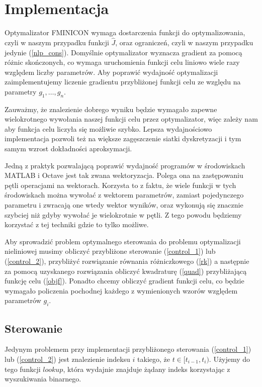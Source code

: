 \documentclass[11pt]{article}
\begin{document}
\section{Implementacja}
Optymalizator FMINICON wymaga dostarczenia funkcji do optymalizowania, czyli w naszym przypadku funkcji $\hat{J}$, oraz ograniczeń, czyli w naszym przypadku jedynie (\ref{nlp_cons}). Domyślnie optymalizator wyznacza gradient za pomocą różnic skończonych, co wymaga uruchomienia funkcji celu liniowo wiele razy względem liczby parametrów. Aby poprawić wydajność optymalizacji zaimplementujemy liczenie gradientu przybliżonej funkcji celu ze względu na parametry $g_1,\ldots, g_n$.

Zauważmy, że znalezienie dobrego wyniku będzie wymagało zapewne wielokrotnego wywołania naszej funkcji celu przez optymalizator, więc zależy nam aby funkcja celu liczyła się możliwie szybko. Lepsza wydajnościowo implementacja pozwoli też na większe zagęszczenie siatki dyskretyzacji i tym samym wzrost dokładności aproksymacji.

Jedną z praktyk pozwalającą poprawić wydajność programów w środowiskach MATLAB i Octave jest tak zwana wektoryzacja. Polega ona na zastępowaniu pętli operacjami na wektorach. Korzysta to z faktu, że wiele funkcji w tych środowiskach można wywołać z wektorem parametrów, zamiast pojedynczego parametru i zwracają one wtedy wektor wyników, oraz wykonują się znacznie szybciej niż gdyby wywołać je wielokrotnie w pętli. Z tego powodu będziemy korzystać z tej techniki gdzie to tylko możliwe.

Aby sprowadzić problem optymalnego sterowania do problemu optymalizacji nieliniowej musimy obliczyć przybliżone sterowanie (\ref{control_1}) lub (\ref{control_2}), przybliżyć rozwiązanie równania różniczkowego (\ref{rk}) a następnie za pomocą uzyskanego rozwiązania obliczyć kwadraturę (\ref{quad}) przybliżającą funkcję celu (\ref{objf}). Ponadto chcemy obliczyć gradient funkcji celu, co będzie wymagało policzenia pochodnej każdego z wymienionych wzorów względem parametrów $g_i$.

\subsection{Sterowanie}\label{subsec_sterowanie}
Jedynym problemem przy implementacji przybliżonego sterowania (\ref{control_1}) lub (\ref{control_2}) jest znalezienie indeksu $i$ takiego, że $t \in [t_{i-1}, t_i)$. Użyjemy do tego funkcji $lookup$, która wydajnie znajduje żądany indeks korzystając z wyszukiwania binarnego.
\end{document}
